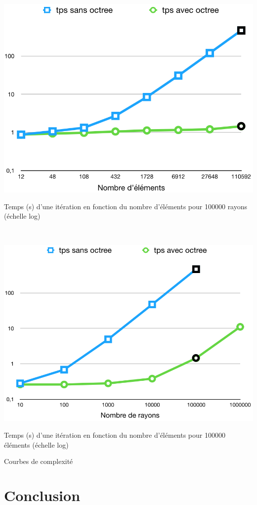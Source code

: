 \begin{figureth}
	\begin{subfigureth}{0.7\textwidth}
		\includegraphics[width=\linewidth]{images/complexite1}
		\caption{Temps (s) d'une itération en fonction du nombre d'éléments pour 100000 rayons (échelle log)}
		\label{complexite1}
	\end{subfigureth} \\
\bigskip
	\begin{subfigureth}{0.7\textwidth}
		\includegraphics[width=\linewidth]{images/complexite2}
		\caption{Temps (s) d'une itération en fonction du nombre d'éléments pour 100000 éléments (échelle log)}
		\label{complexite2}
	\end{subfigureth}
	\caption{Courbes de complexité}
\end{figureth}
	
\chapter*{Conclusion}
	\newpage
	
 
 
